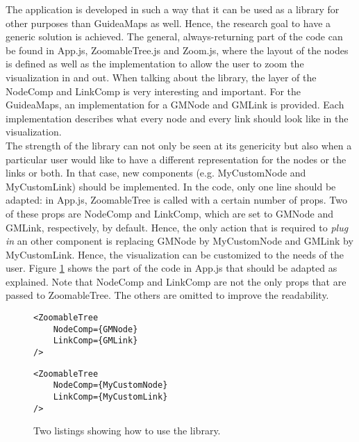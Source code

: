 The application is developed in such a way that it can be used as a library for other purposes than GuideaMaps as well. Hence, the research goal to have a generic solution is achieved. The general, always-returning part of the code can be found in App.js, ZoomableTree.js and Zoom.js, where the layout of the nodes is defined as well as the implementation to allow the user to zoom the visualization in and out. When talking about the library, the layer of the NodeComp and LinkComp is very interesting and important. For the GuideaMaps, an implementation for a GMNode and GMLink is provided. Each implementation describes what every node and every link should look like in the visualization.\\

The strength of the library can not only be seen at its genericity but also when a particular user would like to have a different representation for the nodes or the links or both. In that case, new components (e.g. MyCustomNode and MyCustomLink) should be implemented. In the code, only one line should be adapted: in App.js, ZoomableTree is called with a certain number of props. Two of these props are NodeComp and LinkComp, which are set to GMNode and GMLink, respectively, by default. Hence, the only action that is required to \textit{plug in} an other component is replacing GMNode by MyCustomNode and GMLink by MyCustomLink. Hence, the visualization can be customized to the needs of the user. Figure \ref{fig:examplecode-library} shows the part of the code in App.js that should be adapted as explained. Note that NodeComp and LinkComp are not the only props that are passed to ZoomableTree. The others are omitted to improve the readability.

\begin{figure}[H]
	\begin{minipage}{0.5\textwidth}
 		 \centering
		 \begin{verbatim}
<ZoomableTree
    NodeComp={GMNode}
    LinkComp={GMLink}
/>
		\end{verbatim}
		\label{lst:default-components}
	\end{minipage}
 	\begin{minipage}{0.5\textwidth}
  		\centering
  		\begin{verbatim}
<ZoomableTree
    NodeComp={MyCustomNode}
    LinkComp={MyCustomLink}
/>
		\end{verbatim}
		\label{lst:custom-components}
 	\end{minipage}
	\caption{Two listings showing how to use the library.}
	\label{fig:examplecode-library}
\end{figure}





